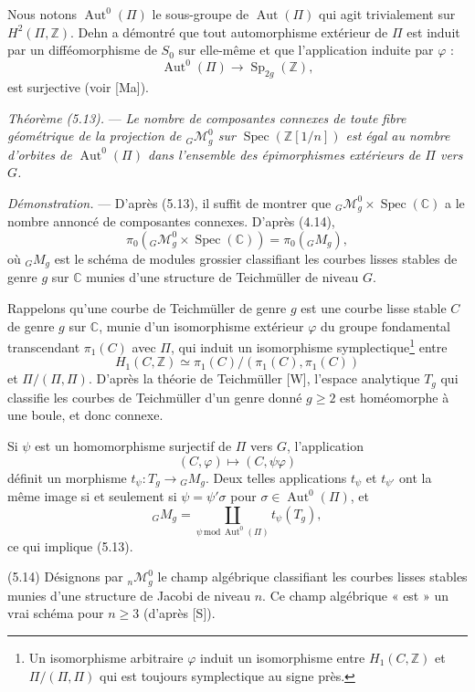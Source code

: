 \documentclass[10pt]{article}
\newcommand{\Spec}{\operatorname{Spec}}
\newcommand{\Aut}{\operatorname{Aut}}
\begin{document}
Nous notons $\Aut^0(\Pi)$ le sous-groupe de $\Aut(\Pi)$ qui agit trivialement sur $H^2(\Pi,\mathbb Z)$. Dehn a démontré que tout automorphisme extérieur de $\Pi$ est induit par un difféomorphisme de $S_0$ sur elle-même et que l'application induite par $\varphi$ :
\[
\Aut^0(\Pi)\longrightarrow \operatorname{Sp}_{2g}(\mathbb Z),
\]
est surjective (voir [Ma]).

\medskip
\noindent\emph{Théorème (5.13).} --- \emph{Le nombre de composantes connexes de toute fibre géométrique de la projection de ${}_G\mathcal M_g^0$ sur $\Spec(\mathbb Z[1/n])$ est égal au nombre d'orbites de $\Aut^0(\Pi)$ dans l'ensemble des épimorphismes extérieurs de $\Pi$ vers $G$.}

\noindent\emph{Démonstration.} --- D'après (5.13), il suffit de montrer que ${}_G\mathcal M_g^0\times\Spec(\mathbb C)$ a le nombre annoncé de composantes connexes. D'après (4.14),
\[
\pi_0({}_G\mathcal M_g^0\times\Spec(\mathbb C))=\pi_0({}_GM_g),
\]
où ${}_GM_g$ est le schéma de modules grossier classifiant les courbes lisses stables de genre $g$ sur $\mathbb C$ munies d'une structure de Teichmüller de niveau $G$.

Rappelons qu'une courbe de Teichmüller de genre $g$ est une courbe lisse stable $C$ de genre $g$ sur $\mathbb C$, munie d'un isomorphisme extérieur $\varphi$ du groupe fondamental transcendant $\pi_1(C)$ avec $\Pi$, qui induit un isomorphisme symplectique\footnote{Un isomorphisme arbitraire $\varphi$ induit un isomorphisme entre $H_1(C,\mathbb Z)$ et $\Pi/(\Pi,\Pi)$ qui est toujours symplectique au signe près.} entre
\[
H_1(C,\mathbb Z)\simeq \pi_1(C)/(\pi_1(C),\pi_1(C))
\]
et $\Pi/(\Pi,\Pi)$. D'après la théorie de Teichmüller [W], l'espace analytique $T_g$ qui classifie les courbes de Teichmüller d'un genre donné $g\geq2$ est homéomorphe à une boule, et donc connexe.

Si $\psi$ est un homomorphisme surjectif de $\Pi$ vers $G$, l'application
\[
(C,\varphi)\longmapsto (C,\psi\varphi)
\]
définit un morphisme $t_\psi:T_g\to{}_GM_g$. Deux telles applications $t_\psi$ et $t_{\psi'}$ ont la même image si et seulement si $\psi=\psi'\sigma$ pour $\sigma\in\Aut^0(\Pi)$, et
\[
{}_GM_g=\coprod_{\psi\,\mathrm{mod}\,\Aut^0(\Pi)} t_\psi(T_g),
\]
ce qui implique (5.13).

\medskip
\noindent(5.14) Désignons par ${}_n\mathcal M_g^0$ le champ algébrique classifiant les courbes lisses stables munies d'une structure de Jacobi de niveau $n$. Ce champ algébrique « est » un vrai schéma pour $n\geq3$ (d'après [S]).
\end{document}
